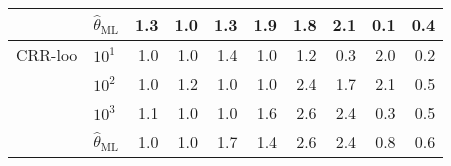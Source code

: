 \documentclass[a4paper,14pt]{extarticle}
\begin{document}
\begin{table}
\begin{tabular}{ll||rrrr|rrrr}
       & $\hat{\theta}_\text{ML}$ &      1.3 &      1.0 &      1.3 &      1.9 &      1.8 &      2.1 &      0.1 &      0.4 \\
  \midrule
  CRR-loo & $10^1$ &      1.0 &      1.0 &      1.4 &      1.0 &      1.2 &      0.3 &      2.0 &      0.2 \\
       & $10^2$ &      1.0 &      1.2 &      1.0 &      1.0 &      2.4 &      1.7 &      2.1 &      0.5 \\
       & $10^3$ &      1.1 &      1.0 &      1.0 &      1.6 &      2.6 &      2.4 &      0.3 &      0.5 \\
       & $\hat{\theta}_\text{ML}$ &      1.0 &      1.0 &      1.7 &      1.4 &      2.6 &      2.4 &      0.8 &      0.6 \\
  \bottomrule
  \end{tabular}
\end{table}
\end{document}

